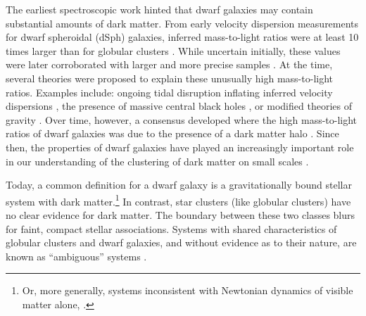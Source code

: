The earliest spectroscopic work hinted that dwarf galaxies may contain
substantial amounts of dark matter. From early velocity dispersion
measurements for dwarf spheroidal (dSph) galaxies, inferred
mass-to-light ratios were at least 10 times larger than for globular
clusters \citep[e.g.,][]{aaronson1983, aaronson+olszewski1987}. While
uncertain initially, these values were later corroborated with larger
and more precise samples \citep[e.g.,][]{hargreaves+1994}. At the time,
several theories were proposed to explain these unusually high
mass-to-light ratios. Examples include: ongoing tidal disruption
inflating inferred velocity dispersions
\citep[e.g.,][]{kuhn+miller1989}, the presence of massive central black
holes \citep[e.g.,][]{strobel+lake1994}, or modified theories of gravity
\citep{milgrom1995}. Over time, however, a consensus developed where the
high mass-to-light ratios of dwarf galaxies was due to the presence of a
dark matter halo \citep[e.g.,][]{dekel+silk1986, wechsler+tinker2018}.
Since then, the properties of dwarf galaxies have played an increasingly
important role in our understanding of the clustering of dark matter on
small scales \citep[e.g.,][]{bullock+boylan-kolchin2017, sales+2022}.

Today, a common definition for a dwarf galaxy is a gravitationally bound
stellar system with dark matter.\footnote{Or, more generally, systems
  inconsistent with Newtonian dynamics of visible matter alone,
  \citet{willman+strader2012}.} In contrast, star clusters (like
globular clusters) have no clear evidence for dark matter. The boundary
between these two classes blurs for faint, compact stellar associations.
Systems with shared characteristics of globular clusters and dwarf
galaxies, and without evidence as to their nature, are known as
``ambiguous'' systems \citep[e.g.,][]{smith+2024}.

